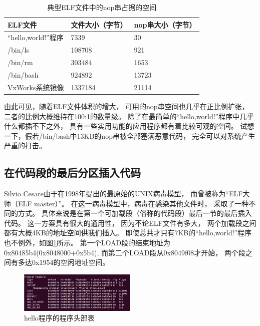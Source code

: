 \begin{table}
  \centering
  \caption{典型ELF文件中的nop串占据的空间}
  \label{nopbytes}
  \begin{tabular}{l|l|l}
     \hline
     ELF文件       & 文件大小（字节）& nop串大小（字节） \\ \hline
 “hello,world!”程序  & 7339           & 30                 \\ \hline
     /bin/ls      & 108708          & 921                \\ \hline
     /bin/rm      & 303484         & 1653                \\ \hline  
     /bin/bash    & 924892        & 13723              \\ \hline
     VxWorks系统镜像 & 1337184        & 21114              \\ \hline
  \end{tabular}
\end{table}  

由此可见，随着ELF文件体积的增大，
可用的nop串空间也几乎在正比例扩张，
二者的比例大概维持在100:1的数量级。
除了在最简单的“hello,world!”程序中几乎什么都插不下之外，
具有一些实用功能的应用程序都有着比较可观的空间。
试想一下，假若/bin/bash中13KB的nop串被全部塞满恶意代码，
完全可以对系统产生严重的打击。

\subsection{在代码段的最后分区插入代码}

Silvio Cesare由于在1998年提出的最原始的UNIX病毒模型，
而曾被称为“ELF大师（ELF master）”。
在这一病毒模型中，病毒在感染其他文件时，
采取了一种不同的方式。
具体来说是在第一个可加载段（俗称的代码段）最后一节的最后插入代码。
这一方案具有很大的通用性，
因为不论ELF文件有多大，
两个加载段之间都有大概4KB的地址空间供我们插入。
即使总共才只有7KB的“hello,world!”程序也不例外，如图\ref{hello}所示。
第一个LOAD段的结束地址为0x80485b4(0x8048000+0x5b4),
而第二个LOAD段从0x8049f08才开始，
两个段之间有多达0x1954的空闲地址空间。

\begin{figure}[h!]
  \centering
  \includegraphics[width=0.5\textwidth]{figure/helloprograms.png}
  \caption{hello程序的程序头部表}
  \label{hello}
\end{figure}

